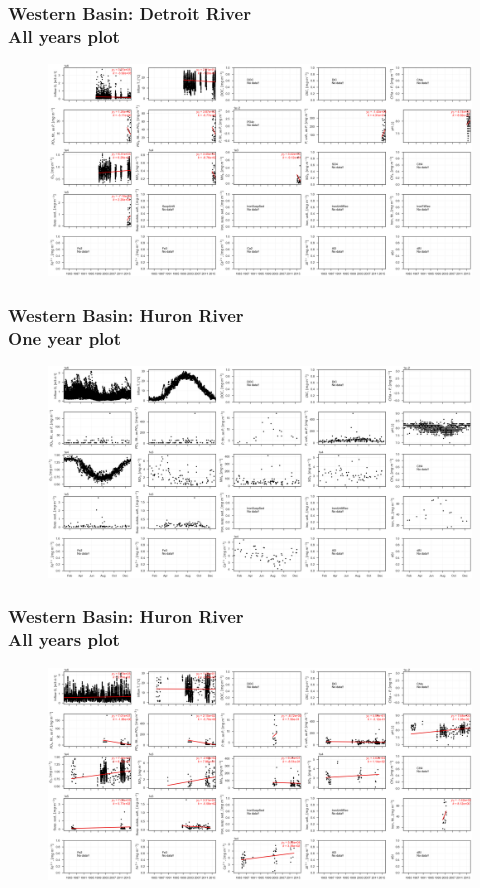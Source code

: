 \documentclass{beamer}
\begin{document}
\begin{frame}
\frametitle{Western Basin: Detroit River\\ All years plot}
\begin{figure}
\includegraphics[width=\textwidth]{rivers/Western basin/plot_all detroitriver.png}
\end{figure}
\end{frame}

\begin{frame}
\frametitle{Western Basin: Huron River\\ One year plot}
\begin{figure}
\includegraphics[width=\textwidth]{rivers/Western basin/plot_1yr huronriver.png}
\end{figure}
\end{frame}

\begin{frame}
\frametitle{Western Basin: Huron River\\ All years plot}
\begin{figure}
\includegraphics[width=\textwidth]{rivers/Western basin/plot_all huronriver.png}
\end{figure}
\end{frame}
\end{document}

